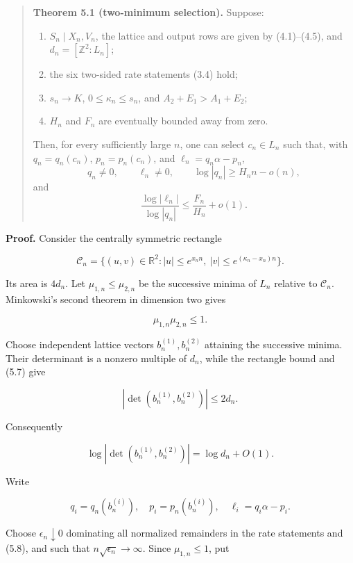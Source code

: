 \documentclass[
  11pt,
]{article}
\providecommand{\tightlist}{%
  \setlength{\itemsep}{0pt}\setlength{\parskip}{0pt}}
\begin{document}
\begin{quote}
\textbf{Theorem 5.1 (two-minimum selection).} Suppose:

\begin{enumerate}
\def\labelenumi{\arabic{enumi}.}
\tightlist
\item
  \(S_n\mid X_n,V_n\), the lattice and output rows are given by
  (4.1)--(4.5), and \(d_n=[\mathbb Z^2:L_n]\);
\item
  the six two-sided rate statements (3.4) hold;
\item
  \(s_n\to K\), \(0\le\kappa_n\le s_n\), and \(A_2+E_1>A_1+E_2\);
\item
  \(H_n\) and \(F_n\) are eventually bounded away from zero.
\end{enumerate}

Then, for every sufficiently large \(n\), one can select \(c_n\in L_n\)
such that, with \(q_n=q_n(c_n)\), \(p_n=p_n(c_n)\), and
\(\ell_n=q_n\alpha-p_n\), \[
q_n\ne0,\qquad \ell_n\ne0,\qquad
\log|q_n|\ge H_nn-o(n),                            \tag{5.4}
\] and \[
\frac{\log|\ell_n|}{\log|q_n|}
\le\frac{F_n}{H_n}+o(1).                          \tag{5.5}
\]
\end{quote}

\textbf{Proof.} Consider the centrally symmetric rectangle

\[
 \mathcal C_n=\{(u,v)\in\mathbb R^2:
 |u|\le e^{x_nn},\ |v|\le e^{(\kappa_n-x_n)n}\}.    \tag{5.6}
\]

Its area is \(4d_n\). Let \(\mu_{1,n}\le\mu_{2,n}\) be the successive
minima of \(L_n\) relative to \(\mathcal C_n\). Minkowski's second
theorem in dimension two gives

\[
 \mu_{1,n}\mu_{2,n}\le1.                            \tag{5.7}
\]

Choose independent lattice vectors \(b_n^{(1)},b_n^{(2)}\) attaining the
successive minima. Their determinant is a nonzero multiple of \(d_n\),
while the rectangle bound and (5.7) give

\[
 |\det(b_n^{(1)},b_n^{(2)})|\le2d_n.
\]

Consequently

\[
 \log|\det(b_n^{(1)},b_n^{(2)})|=\log d_n+O(1).
                                                               \tag{5.8}
\]

Write

\[
 q_i=q_n(b_n^{(i)}),\quad p_i=p_n(b_n^{(i)}),\quad
 \ell_i=q_i\alpha-p_i.
\]

Choose \(\epsilon_n\downarrow0\) dominating all normalized remainders in
the rate statements and (5.8), and such that
\(n\sqrt{\epsilon_n}\to\infty\). Since \(\mu_{1,n}\le1\), put
\end{document}
